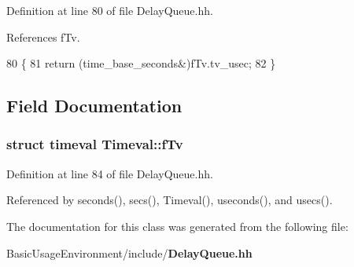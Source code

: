 Definition at line 80 of file Delay\+Queue.\+hh.



References f\+Tv.


\begin{DoxyCode}
80                              \{
81     \textcolor{keywordflow}{return} (time_base_seconds&)fTv.tv\_usec;
82   \}
\end{DoxyCode}


\subsection{Field Documentation}
\subsubsection[{f\+Tv}]{\setlength{\rightskip}{0pt plus 5cm}struct timeval Timeval\+::f\+Tv\hspace{0.3cm}{\ttfamily [private]}}\label{classTimeval_abb6bd9389450ff4f37714e0b99691923}


Definition at line 84 of file Delay\+Queue.\+hh.



Referenced by seconds(), secs(), Timeval(), useconds(), and usecs().



The documentation for this class was generated from the following file\+:\begin{DoxyCompactItemize}
\item 
Basic\+Usage\+Environment/include/{\bf Delay\+Queue.\+hh}\end{DoxyCompactItemize}
